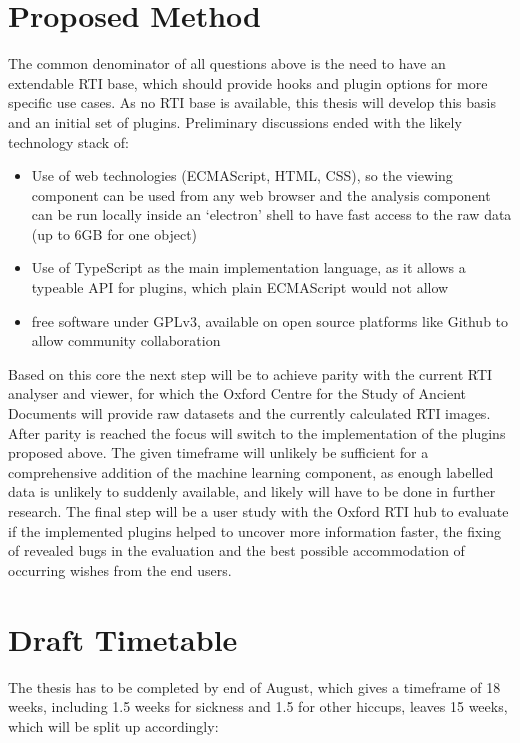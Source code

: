 \documentclass{article}
\begin{document}
\section{Proposed Method}
The common denominator of all questions above is the need to have an extendable
RTI base, which should provide hooks and plugin options for more specific use
cases. As no RTI base is available, this thesis will develop this basis and an
initial set of plugins. Preliminary discussions ended with the likely technology
stack of:
\begin{itemize}
\item Use of web technologies (ECMAScript, HTML, CSS), so the viewing component can be used from any web
  browser and the analysis component can be run locally inside an `electron'
  shell to have fast access to the raw data (up to 6GB for one object)
\item Use of TypeScript as the main implementation language, as it allows a typeable
  API for plugins, which plain ECMAScript would not allow
\item free software under GPLv3, available on open source platforms like Github
  to allow community collaboration
\end{itemize}
Based on this core the next step will be to achieve parity with the current RTI
analyser and viewer, for which the Oxford Centre for the Study of Ancient
Documents will provide raw datasets and the currently calculated RTI images.
After parity is reached the focus will switch to the implementation of the
plugins proposed above. The given timeframe will unlikely be sufficient for a comprehensive
addition of the machine learning component, as enough labelled
data is unlikely to suddenly available, and likely will have to be done in
further research. The final step will be a user study with the Oxford RTI
hub to evaluate if the implemented plugins helped to uncover more information
faster, the fixing of revealed bugs in the evaluation and the best possible
accommodation of occurring wishes from the end users.

\section{Draft Timetable}
The thesis has to be completed by end of August, which gives a timeframe of 18
weeks, including 1.5 weeks for sickness and 1.5 for other hiccups, leaves 15
weeks, which will be split up accordingly:
\end{document}
